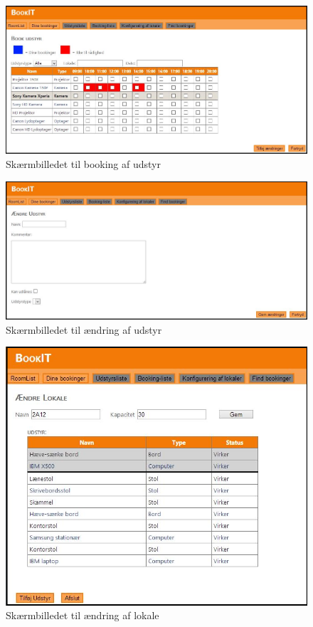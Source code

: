 \begin{figure}[h!]
  \centering
    \includegraphics[width=\textwidth]{Appendix/GUI-Prototype/DigitalMockup/BookEquip}
  \caption{Skærmbilledet til booking af udstyr}
\label{App_GUI_final_BookEquip}
\end{figure}

\begin{figure}[h!]
  \centering
    \includegraphics[width=\textwidth]{Appendix/GUI-Prototype/DigitalMockup/AendreUdstyr}
  \caption{Skærmbilledet til ændring af udstyr}
\label{App_GUI_final_AendreUdstyr}
\end{figure}

\begin{figure}[h!]
  \centering
    \includegraphics[width=\textwidth]{Appendix/GUI-Prototype/DigitalMockup/AendreLokale}
  \caption{Skærmbilledet til ændring af lokale}
\label{App_GUI_final_AendreLokale}
\end{figure}